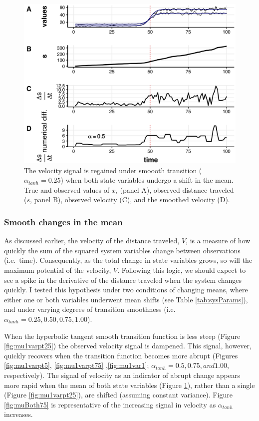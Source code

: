 \documentclass[print]{nuthesis}
\begin{document}
\newpage
\begin{figure}
\includegraphics[width=0.85\linewidth]{./chapterFiles/velocity/figsCalledInDiss/changeMuBoth_tanhAlpha025-05tvdiffAlpha-1000iter_stackTvdiff} \caption{The velocity signal is regained under smoooth transition ($\alpha_{tanh}=0.25$) when both state variables undergo a shift in the mean. True and observed values of $x_i$ (panel A), observed distance traveled ($s$, panel B), observed velocity (C), and the smoothed velocity (D). }\label{fig:muBoth25}
\end{figure}
\hypertarget{smooth-changes-in-the-mean}{%
\subsubsection{Smooth changes in the mean}\label{smooth-changes-in-the-mean}}

As discussed earlier, the velocity of the distance traveled, \(V\), is a measure of how quickly the sum of the squared system variables change between observations (i.e.~time). Consequently, as the total change in state variables grows, so will the maximum potential of the velocity, \(V\). Following this logic, we should expect to see a spike in the derivative of the distance traveled when the system changes quickly. I tested this hypothesis under two conditions of changing means, where either one or both variables underwent mean shifts (see Table \ref{tab:sysParams}), and under varying degrees of transition smoothness (i.e.~\(\alpha_{tanh}={0.25, 0.50, 0.75, 1.00}\)).

When the hyperbolic tangent smooth transition function is less steep (Figure \ref{fig:mu1varpt25}) the observed velocity signal is dampened. This signal, however, quickly recovers when the transition function becomes more abrupt (Figures \ref{fig:mu1varpt5}, \ref{fig:mu1varpt75} ,\ref{fig:mu1var1}; \(\alpha_{tanh}=0.5, 0.75, and 1.00\), respectively). The signal of velocity as an indicator of abrupt change appears more rapid when the mean of both state variables (Figure \ref{fig:muBoth25}), rather than a single (Figure \ref{fig:mu1varpt25}), are shifted (assuming constant variance). Figure \ref{fig:muBoth75} is representative of the increasing signal in velocity as \(\alpha_{tanh}\) increases.
\end{document}
